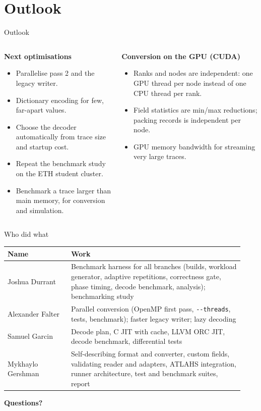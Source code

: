 \documentclass[aspectratio=169,11pt]{beamer}
\begin{document}

\section{Outlook}

\begin{frame}{Outlook}
\begin{columns}[T]
\begin{column}{0.47\textwidth}
\textbf{Next optimisations}
\begin{itemize}
\item Parallelise pass 2 and the legacy writer.
\item Dictionary encoding for few, far-apart values.
\item Choose the decoder automatically from trace size and startup cost.
\item Repeat the benchmark study on the ETH student cluster.
\item Benchmark a trace larger than main memory, for conversion and simulation.
\end{itemize}
\end{column}
\begin{column}{0.49\textwidth}
\textbf{Conversion on the GPU (CUDA)}
\begin{itemize}
\item Ranks and nodes are independent: one GPU thread per node instead of one CPU thread per rank.
\item Field statistics are min/max reductions; packing records is independent per node.
\item GPU memory bandwidth for streaming very large traces.
\end{itemize}
\end{column}
\end{columns}
\end{frame}


\begin{frame}{Who did what}
\small
\begin{tabular}{L{0.25\linewidth}L{0.68\linewidth}}
\toprule
\textbf{Name} & \textbf{Work} \\
\midrule
Joshua Durrant & Benchmark harness for all branches (builds, workload generator, adaptive repetitions, correctness gate, phase timing, decode benchmark, analysis); benchmarking study \\
Alexander Falter & Parallel conversion (OpenMP first pass, \texttt{-{}-threads}, tests, benchmark); faster legacy writer; lazy decoding \\
Samuel Garcin & Decode plan, C JIT with cache, LLVM ORC JIT, decode benchmark, differential tests \\
Mykhaylo Gershman & Self-describing format and converter, custom fields, validating reader and adapters, ATLAHS integration, runner architecture, test and benchmark suites, report \\
\bottomrule
\end{tabular}
\end{frame}

\begin{frame}
\centering\vfill
{\Huge\bfseries Questions?\par}
\vfill
\end{frame}
\end{document}

